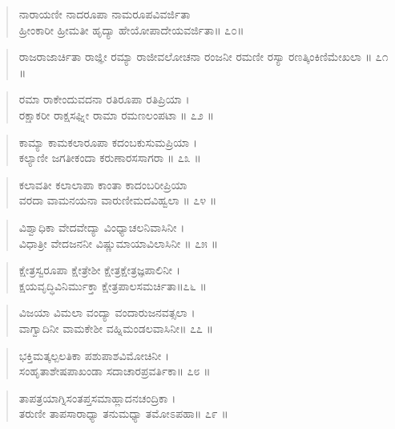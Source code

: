 \begin{verse}
ನಾರಾಯಣೀ ನಾದರೂಪಾ ನಾಮರೂಪವಿವರ್ಜಿತಾ \\ಹ್ರೀಂಕಾರೀ ಹ್ರೀಮತೀ ಹೃದ್ಯಾ ಹೇಯೋಪಾದೇಯವರ್ಜಿತಾ\num{॥ ೭೦॥}
\end{verse}

\begin{verse}
ರಾಜರಾಜಾರ್ಚಿತಾ ರಾಜ್ಞೀ ರಮ್ಯಾ ರಾಜೀವಲೋಚನಾ ರಂಜನೀ ರಮಣೀ  ರಸ್ಯಾ ರಣತ್ಕಿಂಕಿಣಿಮೇಖಲಾ \num{॥ ೭೧ ॥}
\end{verse}

\begin{verse}
ರಮಾ ರಾಕೇಂದುವದನಾ ರತಿರೂಪಾ ರತಿಪ್ರಿಯಾ ।\\ರಕ್ಷಾಕರೀ ರಾಕ್ಷಸಘ್ನೀ ರಾಮಾ ರಮಣಲಂಪಟಾ \num{॥ ೭೨ ॥}
\end{verse}

\begin{verse}
ಕಾಮ್ಯಾ ಕಾಮಕಲಾರೂಪಾ ಕದಂಬಕುಸುಮಪ್ರಿಯಾ ।\\ಕಲ್ಯಾಣೀ ಜಗತೀಕಂದಾ ಕರುಣಾರಸಸಾಗರಾ \num{॥ ೭೩ ॥}
\end{verse}

\begin{verse}
ಕಲಾವತೀ ಕಲಾಲಾಪಾ ಕಾಂತಾ ಕಾದಂಬರೀಪ್ರಿಯಾ \\ವರದಾ ವಾಮನಯನಾ ವಾರುಣೀಮದವಿಹ್ವಲಾ \num{॥ ೭೪ ॥}
\end{verse}

\begin{verse}
ವಿಶ್ವಾಧಿಕಾ ವೇದವೇದ್ಯಾ ವಿಂಧ್ಯಾಚಲನಿವಾಸಿನೀ ।\\ವಿಧಾತ್ರೀ ವೇದಜನನೀ ವಿಷ್ಣುಮಾಯಾವಿಲಾಸಿನೀ \num{॥ ೭೫ ॥}
\end{verse}

\begin{verse}
ಕ್ಷೇತ್ರಸ್ವರೂಪಾ ಕ್ಷೇತ್ರೇಶೀ ಕ್ಷೇತ್ರಕ್ಷೇತ್ರಜ್ಞಪಾಲಿನೀ ।\\ಕ್ಷಯವೃದ್ಧಿವಿನಿರ್ಮುಕ್ತಾ ಕ್ಷೇತ್ರಪಾಲಸಮರ್ಚಿತಾ\num{॥೭೬ ॥}
\end{verse}

\begin{verse}
ವಿಜಯಾ ವಿಮಲಾ ವಂದ್ಯಾ ವಂದಾರುಜನವತ್ಸಲಾ ।\\ವಾಗ್ವಾದಿನೀ  ವಾಮಕೇಶೀ ವಹ್ನಿಮಂಡಲವಾಸಿನೀ\num{॥ ೭೭ ॥}
\end{verse}

\begin{verse}
ಭಕ್ತಿಮತ್ಕಲ್ಪಲತಿಕಾ ಪಶುಪಾಶವಿಮೋಚಿನೀ ।\\ಸಂಹೃತಾಶೇಷಪಾಖಂಡಾ ಸದಾಚಾರಪ್ರವರ್ತಿಕಾ\num{॥ ೭೮ ॥}
\end{verse}

\begin{verse}
ತಾಪತ್ರಯಾಗ್ನಿಸಂತಪ್ತಸಮಾಹ್ಲಾದನಚಂದ್ರಿಕಾ ।\\ತರುಣೀ ತಾಪಸಾರಾಧ್ಯಾ ತನುಮಧ್ಯಾ ತಮೋಽಪಹಾ\num{॥ ೭೯ ॥}
\end{verse}

